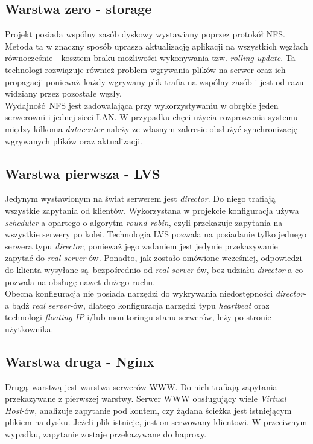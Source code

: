 \subsection{Warstwa zero - storage}
Projekt posiada wspólny zasób dyskowy wystawiany poprzez protokół NFS.
Metoda ta w znaczny sposób uprasza aktualizację aplikacji na wszystkich węzłach równocześnie - kosztem braku możliwości wykonywania tzw. \textit{rolling update}.
Ta technologi rozwiązuje również problem wgrywania plików na serwer oraz ich propagacji ponieważ każdy wgrywany plik trafia na wspólny zasób i jest od razu widziany przez pozostałe węzły.\\
Wydajność NFS jest zadowalająca przy wykorzystywaniu w obrębie jeden serwerowni i jednej sieci LAN.
W przypadku chęci użycia rozproszenia systemu między kilkoma \textit{datacenter} należy ze własnym zakresie obsłużyć synchronizację wgrywanych plików oraz aktualizacji.
\subsection{Warstwa pierwsza - LVS}
Jedynym wystawionym na świat serwerem jest \textit{director}. Do niego trafiają wszystkie zapytania od klientów.
Wykorzystana w projekcie konfiguracja używa \textit{scheduler}-a opartego o algorytm \textit{round robin}, czyli przekazuje zapytania na wszystkie serwery po kolei.
Technologia LVS pozwala na posiadanie tylko jednego serwera typu \textit{director}, ponieważ jego zadaniem jest jedynie przekazywanie zapytać do \textit{real server}-ów.
Ponadto, jak zostało omówione wcześniej, odpowiedzi do klienta wysyłane są bezpośrednio od \textit{real server}-ów, bez udziału \textit{director}-a co pozwala na obsługę nawet dużego ruchu.\\
Obecna konfiguracja nie posiada narzędzi do wykrywania niedostępności \textit{director}-a bądź \textit{real server}-ów, dlatego konfiguracja narzędzi typu \textit{heartbeat} oraz technologi \textit{floating IP} i/lub monitoringu stanu serwerów, leży po stronie użytkownika.
\subsection{Warstwa druga - Nginx}
Drugą warstwą jest warstwa serwerów WWW.
Do nich trafiają zapytania przekazywane z pierwszej warstwy.
Serwer WWW obsługujący wiele \textit{Virtual Host}-ów, analizuje zapytanie pod kontem, czy żądana ścieżka jest istniejącym plikiem na dysku.
Jeżeli plik istnieje, jest on serwowany klientowi.
W przeciwnym wypadku, zapytanie zostaje przekazywane do haproxy.
